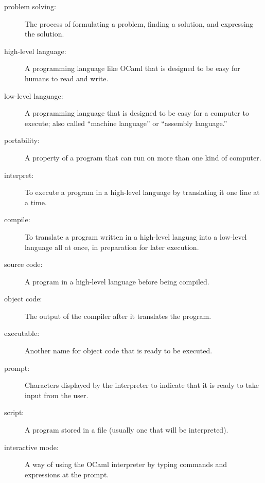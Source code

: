 \documentclass[10pt]{book}
\begin{document}
\begin{description}

\item[problem solving:]  The process of formulating a problem, finding a solution, and expressing the solution.

\item[high-level language:]  A programming language like OCaml that is designed to be easy for humans to read and write.

\item[low-level language:]  A programming language that is designed to be easy for a computer to execute; also called ``machine language'' or ``assembly language.''

\item[portability:]  A property of a program that can run on more than one kind of computer.

\item[interpret:]  To execute a program in a high-level language by translating it one line at a time.

\item[compile:]  To translate a program written in a high-level languag into a low-level language all at once, in preparation for later execution.

\item[source code:]  A program in a high-level language before being compiled.

\item[object code:]  The output of the compiler after it translates the program.

\item[executable:]  Another name for object code that is ready to be executed.

\item[prompt:] Characters displayed by the interpreter to indicate that it is ready to take input from the user.

\item[script:] A program stored in a file (usually one that will be interpreted).

\item[interactive mode:] A way of using the OCaml interpreter by typing commands and expressions at the prompt.


\end{description}
\end{document}
